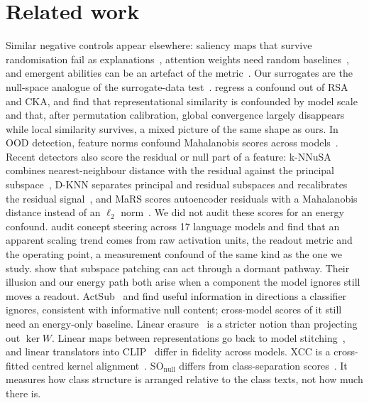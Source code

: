 \documentclass[10pt]{article}
\begin{document}
\section{Related work}
\label{sec:related}
Similar negative controls appear elsewhere: saliency maps that survive randomisation fail as explanations~\citep{adebayo2018sanity}, attention weights need random baselines~\citep{wiegreffe2019attention}, and emergent abilities can be an artefact of the metric~\citep{schaeffer2023mirage}. Our surrogates are the null-space analogue of the surrogate-data test~\citep{theiler1992surrogate}.
\citet{cui2022deconfounded} regress a confound out of RSA and CKA, and \citet{groger2026aristotelian} find that representational similarity is confounded by model scale and that, after permutation calibration, global convergence largely disappears while local similarity survives, a mixed picture of the same shape as ours. In OOD detection, feature norms confound Mahalanobis scores across models~\citep{mueller2025mahalanobis,park2023featurenorm}. Recent detectors also score the residual or null part of a feature: k-NNuSA combines nearest-neighbour distance with the residual against the principal subspace~\citep{nguyen2024knnusa}, D-KNN separates principal and residual subspaces and recalibrates the residual signal~\citep{peng2026hegemony}, and MaRS scores autoencoder residuals with a Mahalanobis distance instead of an $\ell_2$ norm~\citep{disalvo2026mars}. We did not audit these scores for an energy confound. \citet{wu2026steerable} audit concept steering across 17 language models and find that an apparent scaling trend comes from raw activation units, the readout metric and the operating point, a measurement confound of the same kind as the one we study. \citet{makelov2024illusion} show that subspace patching can act through a dormant pathway. Their illusion and our energy path both arise when a component the model ignores still moves a readout.
ActSub~\citep{zongur2025actsub} and \citet{jacobsen2019excessive} find useful information in directions a classifier ignores, consistent with informative null content; cross-model scores of it still need an energy-only baseline. Linear erasure~\citep{ravfogel2020inlp,belrose2023leace} is a stricter notion than projecting out $\ker W$. Linear maps between representations go back to model stitching~\citep{lenc2015understanding,bansal2021stitching}, and linear translators into CLIP~\citep{moayeri2023text2concept} differ in fidelity across models.
XCC is a cross-fitted centred kernel alignment~\citep{cortes2012alignment,kornblith2019cka}. SO$_{\mathrm{null}}$ differs from class-separation scores~\citep{kornblith2021loss,papyan2020collapse}. It measures how class structure is arranged relative to the class texts, not how much there is.
\end{document}
